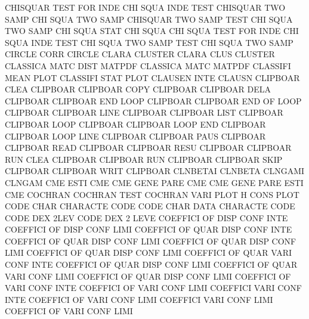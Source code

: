 CHISQUAR TEST FOR  INDE                 CHI      SQUA INDE TEST
CHISQUAR TWO  SAMP                      CHI      SQUA TWO  SAMP
CHISQUAR TWO  SAMP TEST                 CHI      SQUA TWO  SAMP
CHI      SQUA STAT                      CHI      SQUA
CHI      SQUA TEST FOR  INDE            CHI      SQUA INDE TEST
CHI      SQUA TWO  SAMP TEST            CHI      SQUA TWO  SAMP
CIRCLE   CORR                           CIRCLE
CLARA                                   CLUSTER
CLARA    CLUS                           CLUSTER
CLASSICA MATC DIST                      MATPDF
CLASSICA MATC                           MATPDF
CLASSIFI MEAN PLOT                      CLASSIFI STAT PLOT
CLAUSEN  INTE                           CLAUSN
CLIPBOAR CLEA                           CLIPBOAR
CLIPBOAR COPY                           CLIPBOAR
CLIPBOAR DELA                           CLIPBOAR
CLIPBOAR END  LOOP                      CLIPBOAR
CLIPBOAR END  OF   LOOP                 CLIPBOAR
CLIPBOAR LINE                           CLIPBOAR
CLIPBOAR LIST                           CLIPBOAR
CLIPBOAR LOOP                           CLIPBOAR
CLIPBOAR LOOP END                       CLIPBOAR
CLIPBOAR LOOP LINE                      CLIPBOAR
CLIPBOAR PAUS                           CLIPBOAR
CLIPBOAR READ                           CLIPBOAR
CLIPBOAR RESU                           CLIPBOAR
CLIPBOAR RUN  CLEA                      CLIPBOAR
CLIPBOAR RUN                            CLIPBOAR
CLIPBOAR SKIP                           CLIPBOAR
CLIPBOAR WRIT                           CLIPBOAR
CLNBETAI                                CLNBETA
CLNGAMI                                 CLNGAM
CME      ESTI                           CME
CME      GENE PARE                      CME
CME      GENE PARE ESTI                 CME
COCHRAN                                 COCHRAN  TEST
COCHRAN  VARI PLOT                      H        CONS PLOT
CODE     CHAR                           CHARACTE CODE
CODE     CHAR DATA                      CHARACTE CODE
CODE     DEX  2LEV                      CODE     DEX  2    LEVE
COEFFICI OF   DISP CONF INTE            COEFFICI OF   DISP CONF LIMI
COEFFICI OF   QUAR DISP CONF INTE       COEFFICI OF   QUAR DISP CONF LIMI
COEFFICI OF   QUAR DISP CONF LIMI       COEFFICI OF   QUAR DISP CONF LIMI
COEFFICI OF   QUAR VARI CONF INTE       COEFFICI OF   QUAR DISP CONF LIMI
COEFFICI OF   QUAR VARI CONF LIMI       COEFFICI OF   QUAR DISP CONF LIMI
COEFFICI OF   VARI CONF INTE            COEFFICI OF   VARI CONF LIMI
COEFFICI VARI CONF INTE                 COEFFICI OF   VARI CONF LIMI
COEFFICI VARI CONF LIMI                 COEFFICI OF   VARI CONF LIMI
